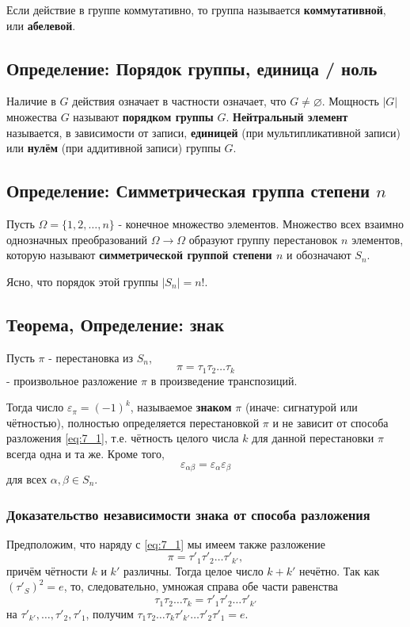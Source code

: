 \documentclass{article}
\begin{document}
Если действие в группе коммутативно, то группа называется \textbf{коммутативной}, или \textbf{абелевой}.

\subsection{Определение: Порядок группы, единица / ноль}

Наличие в $G$ действия означает в частности означает, что $G \neq \varnothing$. Мощность $|G|$ множества $G$ называют \textbf{порядком группы} $G$. \textbf{Нейтральный элемент} называется, в зависимости от записи, \textbf{единицей} (при мультипликативной записи) или \textbf{нулём} (при аддитивной записи) группы $G$.

\subsection{Определение: Симметрическая группа степени $n$}
Пусть $\Omega = \{1, 2, \dots, n\}$ - конечное множество элементов. Множество всех взаимно однозначных преобразований $\Omega \rightarrow \Omega$ образуют группу перестановок $n$ элементов, которую называют \textbf{симметрической группой степени $n$} и обозначают $S_n$.

Ясно, что порядок этой группы $|S_n| = n!$.
\subsection{Теорема, Определение: знак}
Пусть $\pi$ - перестановка из $S_n$, \begin{equation}
\label{eq:7_1}
\pi = \tau_1\tau_2\dots\tau_k
\end{equation} - произвольное разложение $\pi$ в произведение транспозиций.

Тогда число $\varepsilon_\pi = (-1)^k$, называемое \textbf{знаком} $\pi$ (иначе: сигнатурой или чётностью), полностью определяется перестановкой $\pi$ и не зависит от способа разложения \eqref{eq:7_1}, т.е. чётность целого числа $k$ для данной перестановки $\pi$ всегда одна и та же. Кроме того, 
\[ \varepsilon_{\alpha\beta} = \varepsilon_\alpha\varepsilon_\beta \]
для всех $\alpha, \beta \in S_n$.
\subsubsection{Доказательство независимости знака от способа разложения}

Предположим, что наряду с \eqref{eq:7_1} мы имеем также разложение \[
    \pi = \tau'_1\tau'_2\dots\tau'_{k'},
\] причём чётности $k$ и $k'$ различны. Тогда целое число $k + k'$ нечётно. Так как $(\tau'_S)^2 = e$, то, следовательно, умножая справа обе части равенства \[
    \tau_1\tau_2\dots\tau_k = \tau'_1\tau'_2\dots\tau'_{k'}
\] на $\tau'_{k'},\dots,\tau'_2,\tau'_1$, получим $\tau_1\tau_2\dots\tau_k\tau'_{k'}\dots\tau'_2\tau'_1 = e$.
\end{document}
